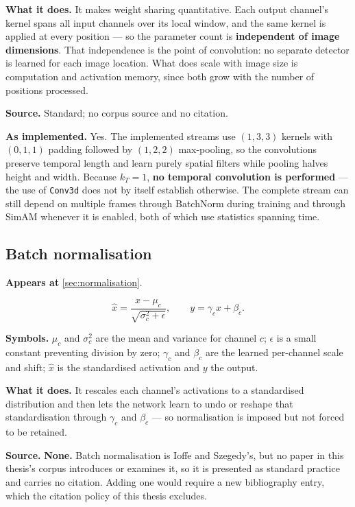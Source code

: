 \textbf{What it does.} It makes weight sharing quantitative. Each output
channel's kernel spans all input channels over its local window, and the same
kernel is applied at every position --- so the parameter count is
\textbf{independent of image dimensions}. That independence is the point of
convolution: no separate detector is learned for each image location. What
does scale with image size is computation and activation memory, since both
grow with the number of positions processed.

\textbf{Source.} Standard; no corpus source and no citation.

\textbf{As implemented.} Yes. The implemented streams use $(1,3,3)$ kernels
with $(0,1,1)$ padding followed by $(1,2,2)$ max-pooling, so the convolutions
preserve temporal length and learn purely spatial filters while pooling halves
height and width. Because $k_T = 1$, \textbf{no temporal convolution is
performed} --- the use of \texttt{Conv3d} does not by itself establish
otherwise. The complete stream can still depend on multiple frames through
BatchNorm during training and through SimAM whenever it is enabled, both of
which use statistics spanning time.

\subsection{Batch normalisation}
\label{eq:batchnorm}

\textbf{Appears at} \autoref{sec:normalisation}.

\[
    \widehat x=\frac{x-\mu_c}{\sqrt{\sigma_c^2+\epsilon}},
    \qquad y=\gamma_c\widehat x+\beta_c.
\]

\textbf{Symbols.} $\mu_c$ and $\sigma_c^2$ are the mean and variance for
channel $c$; $\epsilon$ is a small constant preventing division by zero;
$\gamma_c$ and $\beta_c$ are the learned per-channel scale and shift;
$\widehat x$ is the standardised activation and $y$ the output.

\textbf{What it does.} It rescales each channel's activations to a
standardised distribution and then lets the network learn to undo or reshape
that standardisation through $\gamma_c$ and $\beta_c$ --- so normalisation is
imposed but not forced to be retained.

\textbf{Source.} \textbf{None.} Batch normalisation is Ioffe and Szegedy's,
but no paper in this thesis's corpus introduces or examines it, so it is
presented as standard practice and carries no citation. Adding one would
require a new bibliography entry, which the citation policy of this thesis
excludes.

